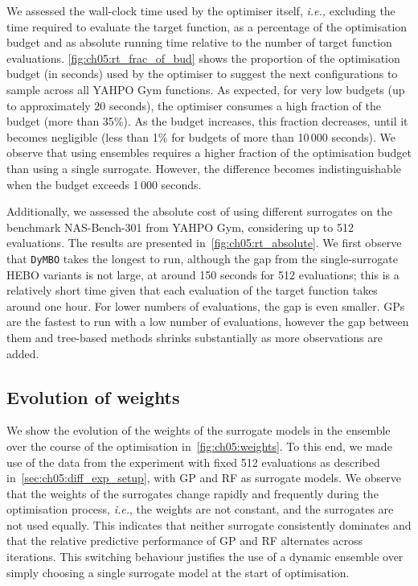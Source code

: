 We assessed the wall-clock time used by the optimiser itself, \emph{i.e.,} excluding the time required to evaluate the target function, as a percentage of the optimisation budget and as absolute running time relative to the number of target function evaluations. 
\cref{fig:ch05:rt_frac_of_bud} shows the proportion of the optimisation budget (in seconds)
used by the optimiser to suggest the next configurations to sample across all YAHPO Gym functions. 
As expected, for very low budgets (up to approximately 20 seconds), the optimiser consumes a high fraction of the budget (more than 35\%). 
As the budget increases, this fraction decreases, until it becomes negligible (less than 1\% for budgets of more than 10\,000 seconds).
We observe that using ensembles requires a higher fraction of the optimisation budget than using a single surrogate. 
However, the difference becomes indistinguishable when the budget exceeds 1\,000 seconds. 

Additionally, we assessed the absolute cost of using different surrogates on the benchmark NAS-Bench-301 from YAHPO Gym, considering up to 512 evaluations. The results are presented in~\cref{fig:ch05:rt_absolute}. 
We first observe that \texttt{DyMBO} 
takes the longest to run, although the gap from the single-surrogate HEBO variants is not large, at around 150 seconds for 512 evaluations; this is a relatively short time given that each evaluation of the target function takes around one hour. For lower numbers of evaluations, the gap is even smaller.
GPs are the fastest to run with a low number of evaluations, however the gap between them and tree-based methods shrinks substantially as more observations are added.



\subsection{Evolution of weights}
\label{sec:ch05:weights}

We show the evolution of the weights of the surrogate models in the ensemble over the course of the optimisation in~\cref{fig:ch05:weights}. 
To this end, we made use of the data from the experiment with fixed 512 evaluations as described in~\cref{sec:ch05:diff_exp_setup}, with GP and RF as surrogate models.
We observe that the weights of the surrogates change rapidly and frequently during the optimisation process, \emph{i.e.}, the weights are not constant, and the surrogates are not used equally. 
This indicates that neither surrogate consistently dominates 
and that the relative predictive performance of GP and RF alternates across iterations.
This switching behaviour justifies the use of a dynamic ensemble over simply choosing a single surrogate model at the start of optimisation.

